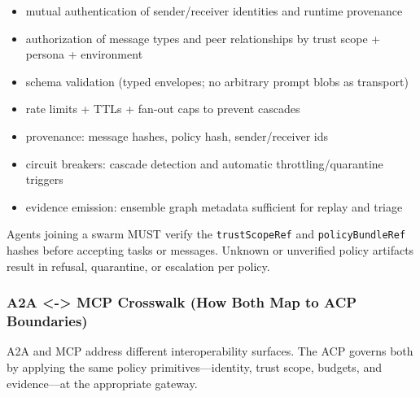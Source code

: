 \documentclass[11pt]{article}
\begin{document}
\begin{itemize}
\tightlist
\item
  mutual authentication of sender/receiver identities and runtime
  provenance
\item
  authorization of message types and peer relationships by trust scope +
  persona + environment
\item
  schema validation (typed envelopes; no arbitrary prompt blobs as
  transport)
\item
  rate limits + TTLs + fan-out caps to prevent cascades
\item
  provenance: message hashes, policy hash, sender/receiver ids
\item
  circuit breakers: cascade detection and automatic
  throttling/quarantine triggers
\item
  evidence emission: ensemble graph metadata sufficient for replay and
  triage
\end{itemize}

Agents joining a swarm MUST verify the \texttt{trustScopeRef} and
\texttt{policyBundleRef} hashes before accepting tasks or messages.
Unknown or unverified policy artifacts result in refusal, quarantine, or
escalation per policy.

\hypertarget{a2a-mcp-crosswalk-how-both-map-to-acp-boundaries}{%
\subsubsection{A2A <-> MCP Crosswalk (How Both Map to ACP Boundaries)}\label{a2a-mcp-crosswalk-how-both-map-to-acp-boundaries}}

A2A and MCP address different interoperability surfaces. The ACP governs
both by applying the same policy primitives---identity, trust scope,
budgets, and evidence---at the appropriate gateway.
\end{document}
